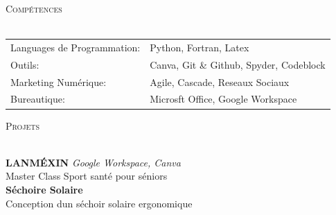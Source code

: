 \documentclass[a4paper]{article}
\newcommand{\lineunder} {
    \vspace*{-8pt} \\
    \hspace*{-18pt} \hrulefill \\
}
\newcommand{\header} [1] {
    {\hspace*{-18pt}\vspace*{6pt} \textsc{#1}}
    \vspace*{-6pt} \lineunder
}
\begin{document}
\header{Compétences}
\vspace{5mm}

\begin{tabular}{ l l }
	Languages de Programmation: & Python, Fortran, Latex                  \\
	Outils:                     & Canva, Git \& Github, Spyder, Codeblock \\
	Marketing Numérique:       & Agile, Cascade, Reseaux Sociaux         \\
	Bureautique:                & Microsft Office, Google Workspace       \\
\end{tabular}
\vspace{0,5cm}

\header{Projets}
\vspace{5mm}

{\textbf{LAN\textquotesingle{}MÉXIN}} {\sl Google Workspace, Canva} \\
Master Class Sport santé pour séniors\\
\vspace*{2mm}
{\textbf{Séchoire Solaire}}\\
Conception d\textquotesingle{}un séchoir solaire ergonomique\\
\vspace*{2mm}



\ 
\end{document}
